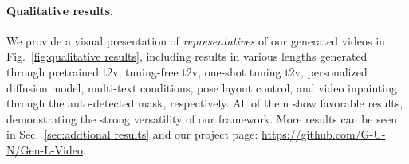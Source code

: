 \documentclass{article}
\begin{document}
\paragraph{Qualitative results.}
We provide a visual presentation of \textit{representatives} of our generated videos in Fig.~\ref{fig:qualitative results}, including results in various lengths generated through pretrained t2v, tuning-free t2v, one-shot tuning t2v, personalized diffusion model, multi-text conditions, pose layout control, and video inpainting through the auto-detected mask, respectively. All of them show favorable results, demonstrating the strong versatility of our framework. More results can be seen in Sec.~\ref{sec:addtional results} and our project page: \url{https://github.com/G-U-N/Gen-L-Video}. 


\begin{table}[t]
\vspace{-2.5em}
\begin{minipage}[t]{0.48\linewidth}
\centering
\caption{\textit{\textbf{Quantitative comparison.}}}
\label{tab:quant}
\vspace{-0.5em}
\end{minipage}%
\hfill
\begin{minipage}[t]{0.48\linewidth}
\centering
\caption{\textit{\textbf{Comparison to different methods.}}}\label{tab:comparison box}
\vspace{-0.5em}
\end{minipage}
\end{table}
\end{document}
